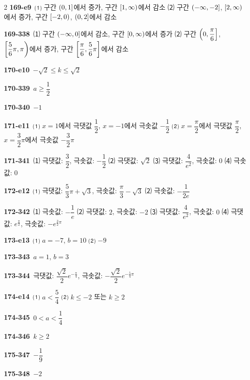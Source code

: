 \documentclass[10pt,a4paper]{article}
\begin{document}
\begin{multicols}{2}
\noindent\textbf{169-e9}\ ⑴ 구간 $(0{,}\mkern3mu\mathopen{}1]$에서 증가, 구간 $[1{,}\mkern3mu\mathopen{}\infty)$에서 감소 ⑵ 구간 $(-\infty{,}\mkern3mu\mathopen{}-2]$, $[2{,}\mkern3mu\mathopen{}\infty)$에서 증가, 구간 $[-2{,}\mkern3mu\mathopen{}0)$, $(0{,}\mkern3mu\mathopen{}2]$에서 감소\par
\noindent\textbf{169-338}\ ⑴ 구간 $(-\infty{,}\mkern3mu\mathopen{}0]$에서 감소, 구간 $[0{,}\mkern3mu\mathopen{}\infty)$에서 증가 ⑵ 구간 $\left(0{,}\mkern3mu\mathopen{}\dfrac{\pi}{6}\right]$, $\left[\dfrac{5}{6}\pi{,}\mkern3mu\mathopen{}\pi\right)$에서 증가, 구간 $\left[\dfrac{\pi}{6}{,}\mkern3mu\mathopen{}\dfrac{5}{6}\pi\right]$에서 감소\par
\noindent\textbf{170-e10}\ $-\sqrt{2}\le k\le\sqrt{2}$\par
\noindent\textbf{170-339}\ $a\ge\dfrac{1}{2}$\par
\noindent\textbf{170-340}\ $-1$\par
\noindent\textbf{171-e11}\ ⑴ $x=1$에서 극댓값 $\dfrac{1}{2}$, $x=-1$에서 극솟값 $-\dfrac{1}{2}$ ⑵ $x=\dfrac{\pi}{2}$에서 극댓값 $\dfrac{\pi}{2}$, $x=\dfrac{3}{2}\pi$에서 극솟값 $-\dfrac{3}{2}\pi$\par
\noindent\textbf{171-341}\ ⑴ 극댓값: $\dfrac{3}{2}$, 극솟값: $-\dfrac{1}{2}$ ⑵ 극댓값: $\sqrt{2}$ ⑶ 극댓값: $\dfrac{4}{e^2}$, 극솟값: $0$ ⑷ 극솟값: $0$\par
\noindent\textbf{172-e12}\ ⑴ 극댓값: $\dfrac{5}{3}\pi+\sqrt{3}$, 극솟값: $\dfrac{\pi}{3}-\sqrt{3}$ ⑵ 극솟값: $-\dfrac{1}{2e}$\par
\noindent\textbf{172-342}\ ⑴ 극솟값: $-\dfrac{1}{e}$ ⑵ 극댓값: $2$, 극솟값: $-2$ ⑶ 극댓값: $\dfrac{4}{e^2}$, 극솟값: $0$ ⑷ 극댓값: $e^{\frac{\pi}{2}}$, 극솟값: $-e^{\frac{3}{2}\pi}$\par
\noindent\textbf{173-e13}\ ⑴ $a=-7$, $b=10$ ⑵ $-9$\par
\noindent\textbf{173-343}\ $a=1$, $b=3$\par
\noindent\textbf{173-344}\ 극댓값: $\dfrac{\sqrt{2}}{2}e^{-\frac{\pi}{4}}$, 극솟값: $-\dfrac{\sqrt{2}}{2}e^{-\frac{5}{4}\pi}$\par
\noindent\textbf{174-e14}\ ⑴ $a<\dfrac{5}{4}$ ⑵ $k\le -2$ 또는 $k\ge 2$\par
\noindent\textbf{174-345}\ $0<a<\dfrac{1}{4}$\par
\noindent\textbf{174-346}\ $k\ge 2$\par
\noindent\textbf{175-347}\ $-\dfrac{1}{9}$\par
\noindent\textbf{175-348}\ $-2$\par

\end{multicols}
\end{document}
